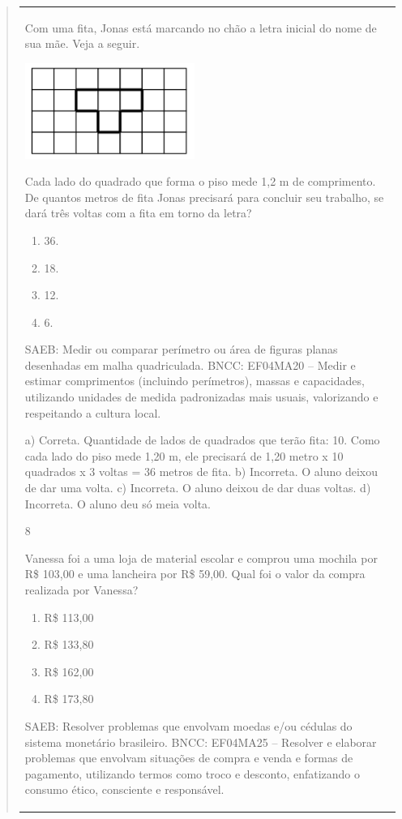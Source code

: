 \begin{mdframed}[linewidth=2pt,linecolor=salmao,roundcorner=2pt]
\begin{itemize}
{\begin{itemize}
\begin{escolha}
{\begin{quote}
{\begin{escolha}
{{{{{\begin{longtable}[]{@{}l@{}}
\begin{itemize}
{Com uma fita, Jonas está marcando no chão a letra inicial do nome de
sua mãe. Veja a seguir.

\includegraphics[width=2.17519in,height=1.22511in]{media/image155.png}

Cada lado do quadrado que forma o piso mede 1,2 m de
comprimento. De quantos metros de fita Jonas precisará para concluir seu
trabalho, se dará três voltas com a fita em torno da letra?

\begin{enumerate}
\item
  36.
\item
  18.
\item
  12.
\item
  6.
\end{enumerate}

SAEB: Medir ou comparar perímetro ou área de figuras planas
desenhadas em malha quadriculada.
BNCC: EF04MA20 -- Medir e estimar comprimentos (incluindo perímetros), massas e capacidades, utilizando
unidades de medida padronizadas mais usuais, valorizando e respeitando a cultura local.

a) Correta. Quantidade de lados de quadrados que terão fita: 10. Como cada lado do piso mede 1,20 m, ele precisará de 1,20 metro x 10 quadrados x 3 voltas = 36 metros de fita.
b) Incorreta. O aluno deixou de dar uma volta.
c) Incorreta. O aluno deixou de dar duas voltas.
d) Incorreta. O aluno deu só meia volta.

\num{8}

Vanessa foi a uma loja de material escolar e comprou uma mochila por R\$ 103,00 e uma lancheira por R\$ 59,00. Qual foi o valor da compra realizada por Vanessa?

\begin{enumerate}
\item
  R\$ 113,00
\item
  R\$ 133,80
\item
  R\$ 162,00
\item
  R\$ 173,80
\end{enumerate}

SAEB: Resolver problemas que envolvam moedas e/ou cédulas do
sistema monetário brasileiro.
BNCC: EF04MA25 -- Resolver e elaborar problemas que envolvam situações de compra e venda e formas
de pagamento, utilizando termos como troco e desconto, enfatizando o consumo ético, consciente e
responsável.

}
\end{itemize}
\end{longtable}}}}}}
\end{escolha}}
\end{quote}}
\end{escolha}
\end{itemize}}
\end{itemize}
\end{mdframed}
